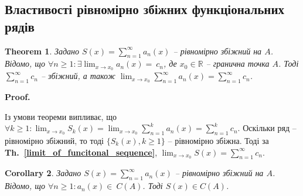 \documentclass[a4paper, 10pt]{article}
\makeatletter
\def\huge{\displaystyle}
\theoremstyle{theoremdd}
\newtheorem{theorem}{Theorem}[subsection]
\theoremstyle{theoremdd}
\theoremstyle{theoremdd}
\theoremstyle{theoremdd}
\theoremstyle{theoremdd}
\theoremstyle{theoremdd}
\theoremstyle{theoremdd}
\theoremstyle{theoremdd}
\theoremstyle{theoremdd}
\newtheorem{corollary}[theorem]{Corollary}
\newcommand\thref[1]{\textbf{Th.~\ref{#1}}}
\renewenvironment{proof}[1][Proof.\\]{\par
\pushQED{\hfill \qed}%
\normalfont \topsep6\p@\@plus6\p@\relax
\trivlist
\item\relax
{\bfseries
#1\@addpunct{.}}\hspace\labelsep\ignorespaces
}{%
\popQED\endtrivlist\@endpefalse
}
\makeatother
\begin{document}
\subsection{Властивості рівномірно збіжних функціональних рядів}
\begin{theorem}
Задано $S(x) = \huge\sum_{n=1}^\infty a_n(x)$ -- рівномірно збіжний на $A$. Відомо, що $\forall n \geq 1: \exists \huge\lim_{x \to x_0} a_n(x) = ~{c_n}$, де $x_0 \in \mathbb{R}$ -- гранична точка $A$. Тоді $\huge\sum_{n=1}^\infty c_n$ -- збіжний, а також $\huge\lim_{x \to x_0} \sum_{n=1}^\infty a_n(x) = \sum_{n=1}^\infty c_n$.
\end{theorem}

\begin{proof}
Із умови теореми випливає, що $\forall k \geq 1: \huge\lim_{x \to x_0} S_k(x) = \lim_{x \to x_0} \huge\sum_{n=1}^k a_n(x) = \huge\sum_{n=1}^k c_n$. Оскільки ряд -- рівномірно збіжний, то тоді $\{S_k(x), k \geq 1\}$ -- рівномірно збіжна. Тоді за \thref{limit_of_funcitonal_sequence},  $\huge\lim_{x \to x_0} S(x) = \sum_{n=1}^\infty c_n$.
\end{proof}

\begin{corollary}
Задано $S(x) = \huge \sum_{n=1}^\infty a_n(x)$ -- рівномірно збіжний на $A$. Відомо, що $\forall n \geq 1: a_n(x) \in ~{C(A)}$. Тоді $S(x) \in C(A)$.
\end{corollary}

\end{document}
